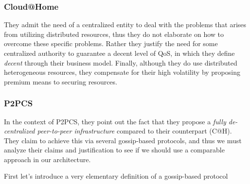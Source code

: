 \documentclass[11pt]{amsart}
\begin{document}
	\subsubsection{Cloud@Home}
	They admit the need of a centralized entity to deal with the problems that arises from 
	utilizing distributed resources, thus they do not elaborate on how to overcome these 
	specific problems. Rather they justify the need for some centralized authority to guarantee 
	a decent level of QoS, in which they define \emph{decent} through their business model. 
	Finally, although they do use distributed heterogeneous resources, they compensate for 
	their high volatility by proposing premium means to securing resources. 
	
	\subsubsection{P2PCS}
	In the context of P2PCS, they point out the fact that they propose a \emph{fully de-centralized 
	peer-to-peer infrastructure} compared to their counterpart (C@H). They claim to achieve this via 
	several gossip-based protocols, and thus we must analyze their claims and justification to see 
	if we should use a comparable approach in our architecture.
	
	First let's introduce a very elementary definition of a gossip-based protocol
	
	
	\clearpage



\end{document}
